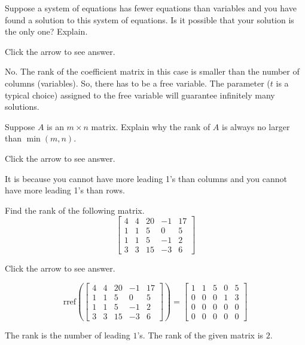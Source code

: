 \documentclass{ximera}
\begin{document}
\begin{problem}\label{prb:2.39} Suppose a system of equations has fewer equations than variables and
you have found a solution to this system of equations. Is it possible that
your solution is the only one? Explain.

Click the arrow to see answer. 
\begin{expandable}
No. The rank of the coefficient matrix in this case is smaller than the number of columns (variables).  So, there has to be a free variable.  The parameter ($t$ is a typical choice) assigned to the free variable will guarantee infinitely many solutions.
\end{expandable}
\end{problem}

\begin{problem}\label{prb:2.55} Suppose $A$ is an $m\times n$ matrix. Explain why the rank of $A$ is
always no larger than $\min \left( m,n\right).$

Click the arrow to see answer. 
\begin{expandable}
It is because you cannot
have more leading 1's than columns and you cannot have more leading 1's than rows.
\end{expandable}
\end{problem}

\begin{problem}\label{prb:2.53} Find the rank of the following matrix.
$$\begin{bmatrix}
4 & 4 & 20 & -1 & 17 \\
1 & 1 & 5 & 0 & 5 \\
1 & 1 & 5 & -1 & 2 \\
3 & 3 & 15 & -3 & 6
\end{bmatrix}$$

Click the arrow to see answer. 
\begin{expandable}
$$\text{rref}\left(\begin{bmatrix}4 & 4 & 20 & -1 & 17 \\
1 & 1 & 5 & 0 & 5 \\
1 & 1 & 5 & -1 & 2 \\
3 & 3 & 15 & -3 & 6\end{bmatrix}\right)=\begin{bmatrix}1 &1 &5 &0 &5\\
 0 & 0 &0 &1 &3\\
 0 &0 &0 &0 &0\\
 0& 0& 0& 0& 0\end{bmatrix}$$

 The rank is the number of leading $1$'s.  The rank of the given matrix is $2$.
\end{expandable}
\end{problem}
\end{document}
